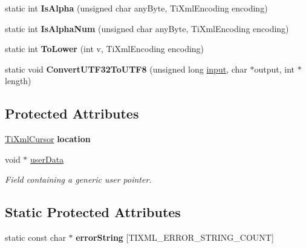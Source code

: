 \begin{DoxyCompactItemize}
\item 
\mbox{\label{classTiXmlBase_ae22522b2e8e1ac43102d16394f639fc8}} 
static int {\bfseries Is\+Alpha} (unsigned char any\+Byte, Ti\+Xml\+Encoding encoding)
\item 
\mbox{\label{classTiXmlBase_a321919055c115c78ded17f85a793f368}} 
static int {\bfseries Is\+Alpha\+Num} (unsigned char any\+Byte, Ti\+Xml\+Encoding encoding)
\item 
\mbox{\label{classTiXmlBase_a799f17405a86a5c2029618e85f11a097}} 
static int {\bfseries To\+Lower} (int v, Ti\+Xml\+Encoding encoding)
\item 
\mbox{\label{classTiXmlBase_a07c765e3a7f979d343e646ea797b180b}} 
static void {\bfseries Convert\+U\+T\+F32\+To\+U\+T\+F8} (unsigned long \hyperlink{classinput}{input}, char $\ast$output, int $\ast$length)
\end{DoxyCompactItemize}
\subsection*{Protected Attributes}
\begin{DoxyCompactItemize}
\item 
\mbox{\label{classTiXmlBase_a0d992580f3bc264909f898e942677a3c}} 
\hyperlink{structTiXmlCursor}{Ti\+Xml\+Cursor} {\bfseries location}
\item 
\mbox{\label{classTiXmlBase_ab242c01590191f644569fa89a080d97c}} 
void $\ast$ \hyperlink{classTiXmlBase_ab242c01590191f644569fa89a080d97c}{user\+Data}
\begin{DoxyCompactList}\small\item\em Field containing a generic user pointer. \end{DoxyCompactList}\end{DoxyCompactItemize}
\subsection*{Static Protected Attributes}
\begin{DoxyCompactItemize}
\item 
static const char $\ast$ {\bfseries error\+String} \mbox{[}T\+I\+X\+M\+L\+\_\+\+E\+R\+R\+O\+R\+\_\+\+S\+T\+R\+I\+N\+G\+\_\+\+C\+O\+U\+NT\mbox{]}
\end{DoxyCompactItemize}
